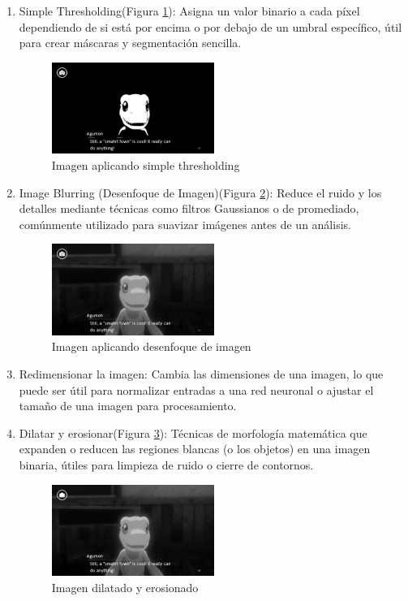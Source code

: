 \begin{enumerate}
	\item Simple Thresholding(Figura \ref{fig:S.Threshold}): 
	Asigna un valor binario a cada píxel dependiendo de si está por encima o por debajo de un umbral específico, útil para crear máscaras y segmentación sencilla.
		\begin{figure}[H]
		\centering
		\includegraphics[width = 0.5\textwidth]{Imagenes/Preprocesado/7.png}
		\caption{Imagen aplicando simple thresholding}
		\label{fig:S.Threshold}
	\end{figure}
	
	\item Image Blurring (Desenfoque de Imagen)(Figura \ref{fig:Blurring}): 
	Reduce el ruido y los detalles mediante técnicas como filtros Gaussianos o de promediado, comúnmente utilizado para suavizar imágenes antes de un análisis.
		\begin{figure}[H]
		\centering
		\includegraphics[width = 0.5\textwidth]{Imagenes/Preprocesado/8.png}
			\caption{Imagen aplicando desenfoque de imagen}
			\label{fig:Blurring}
	\end{figure}
	
	\item Redimensionar la imagen: 
	Cambia las dimensiones de una imagen, lo que puede ser útil para normalizar entradas a una red neuronal o ajustar el tamaño de una imagen para procesamiento.
		
	\item Dilatar y erosionar(Figura \ref{fig:Dilate_Erode}): 
	Técnicas de morfología matemática que expanden o reducen las regiones blancas (o los objetos) en una imagen binaria, útiles para limpieza de ruido o cierre de contornos.
		\begin{figure}[H]
		\centering
		\includegraphics[width = 0.5\textwidth]{Imagenes/Preprocesado/10.png}
			\caption{Imagen dilatado y erosionado}
			\label{fig:Dilate_Erode}
	\end{figure}
	

\end{enumerate}
